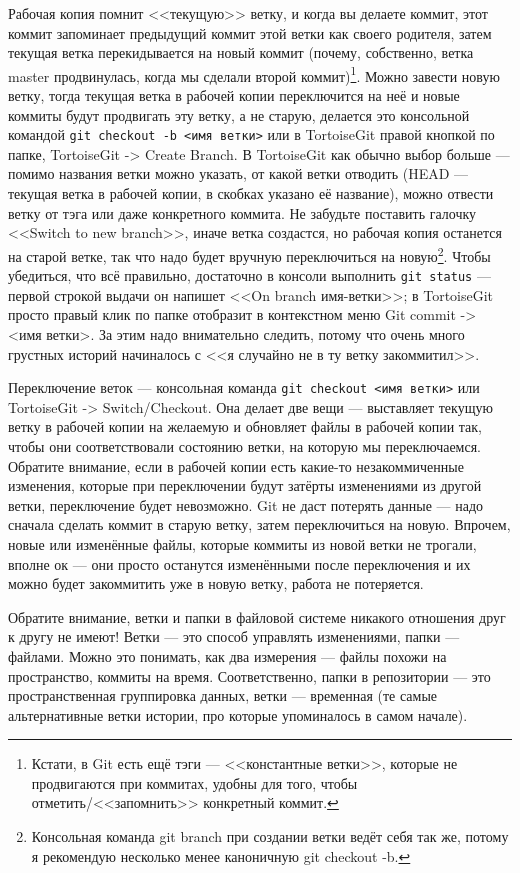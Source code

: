 \documentclass{../text-style}
\begin{document}
Рабочая копия помнит <<текущую>> ветку, и когда вы делаете коммит, этот коммит запоминает предыдущий коммит этой ветки как своего родителя, затем текущая ветка перекидывается на новый коммит (почему, собственно, ветка master продвинулась, когда мы сделали второй коммит)\footnote{Кстати, в Git есть ещё тэги --- <<константные ветки>>, которые не продвигаются при коммитах, удобны для того, чтобы отметить/<<запомнить>> конкретный коммит.}. Можно завести новую ветку, тогда текущая ветка в рабочей копии переключится на неё и новые коммиты будут продвигать эту ветку, а не старую, делается это консольной командой \verb|git checkout -b <имя ветки>| или в TortoiseGit правой кнопкой по папке, TortoiseGit -> Create Branch. В TortoiseGit как обычно выбор больше --- помимо названия ветки можно указать, от какой ветки отводить (HEAD --- текущая ветка в рабочей копии, в скобках указано её название), можно отвести ветку от тэга или даже конкретного коммита. Не забудьте поставить галочку <<Switch to new branch>>, иначе ветка создастся, но рабочая копия останется на старой ветке, так что надо будет вручную переключиться на новую\footnote{Консольная команда git branch при создании ветки ведёт себя так же, потому я рекомендую несколько менее каноничную git checkout -b.}. Чтобы убедиться, что всё правильно, достаточно в консоли выполнить \verb|git status| --- первой строкой выдачи он напишет <<On branch имя-ветки>>; в TortoiseGit просто правый клик по папке отобразит в контекстном меню Git commit -> <имя ветки>. За этим надо внимательно следить, потому что очень много грустных историй начиналось с <<я случайно не в ту ветку закоммитил>>.

Переключение веток --- консольная команда \verb|git checkout <имя ветки>| или TortoiseGit -> Switch/Checkout. Она делает две вещи --- выставляет текущую ветку в рабочей копии на желаемую и обновляет файлы в рабочей копии так, чтобы они соответствовали состоянию ветки, на которую мы переключаемся. Обратите внимание, если в рабочей копии есть какие-то незакоммиченные изменения, которые при переключении будут затёрты изменениями из другой ветки, переключение будет невозможно. Git не даст потерять данные --- надо сначала сделать коммит в старую ветку, затем переключиться на новую. Впрочем, новые или изменённые файлы, которые коммиты из новой ветки не трогали, вполне ок --- они просто останутся изменёнными после переключения и их можно будет закоммитить уже в новую ветку, работа не потеряется.

Обратите внимание, ветки и папки в файловой системе никакого отношения друг к другу не имеют! Ветки --- это способ управлять изменениями, папки --- файлами. Можно это понимать, как два измерения --- файлы похожи на пространство, коммиты на время. Соответственно, папки в репозитории --- это пространственная группировка данных, ветки --- временная (те самые альтернативные ветки истории, про которые упоминалось в самом начале).
\end{document}
